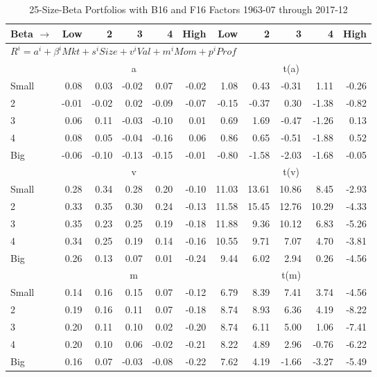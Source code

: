 
\begin{table}[H]
\footnotesize
\centering
\caption{25-Size-Beta Portfolios with B16 and F16 Factors
1963-07 through 2017-12}
\begin{tabular}{lrrrrrrrrrr}
  \toprule
    
    Beta $\rightarrow$ & Low & 2 & 3 & 4 & High & Low & 2 & 3 & 4 & High  \\ 
  \midrule
  \multicolumn{11}{l}{$R^i=a^i+\beta^iMkt+s^iSize+v^iVal+m^iMom+p^iProf$}  \\
  
     & \multicolumn{5}{c}{a} & \multicolumn{5}{c}{t(a)}   \\
     \cmidrule(r){2-6} \cmidrule(r){7-11} 
    Small  & 0.08  & 0.03  & -0.02  & 0.07  & -0.02  & 1.08  & 0.43  & -0.31  & 1.11  & -0.26   \\
    2  & -0.01  & -0.02  & 0.02  & -0.09  & -0.07  & -0.15  & -0.37  & 0.30  & -1.38  & -0.82   \\
    3  & 0.06  & 0.11  & -0.03  & -0.10  & 0.01  & 0.69  & 1.69  & -0.47  & -1.26  & 0.13   \\
    4  & 0.08  & 0.05  & -0.04  & -0.16  & 0.06  & 0.86  & 0.65  & -0.51  & -1.88  & 0.52   \\
    Big  & -0.06  & -0.10  & -0.13  & -0.15  & -0.01  & -0.80  & -1.58  & -2.03  & -1.68  & -0.05   \\

     & \multicolumn{5}{c}{v} & \multicolumn{5}{c}{t(v)}   \\
     \cmidrule(r){2-6} \cmidrule(r){7-11} 
    Small  & 0.28  & 0.34  & 0.28  & 0.20  & -0.10  & 11.03  & 13.61  & 10.86  & 8.45  & -2.93   \\
    2  & 0.33  & 0.35  & 0.30  & 0.24  & -0.13  & 11.58  & 15.45  & 12.76  & 10.29  & -4.33   \\
    3  & 0.35  & 0.23  & 0.25  & 0.19  & -0.18  & 11.88  & 9.36  & 10.12  & 6.83  & -5.26   \\
    4  & 0.34  & 0.25  & 0.19  & 0.14  & -0.16  & 10.55  & 9.71  & 7.07  & 4.70  & -3.81   \\
    Big  & 0.26  & 0.13  & 0.07  & 0.01  & -0.24  & 9.44  & 6.02  & 2.94  & 0.26  & -4.56   \\
    
  
     & \multicolumn{5}{c}{m} & \multicolumn{5}{c}{t(m)}   \\
     \cmidrule(r){2-6} \cmidrule(r){7-11} 
    Small  & 0.14  & 0.16  & 0.15  & 0.07  & -0.12  & 6.79  & 8.39  & 7.41  & 3.74  & -4.56   \\
    2  & 0.19  & 0.16  & 0.11  & 0.07  & -0.18  & 8.74  & 8.93  & 6.36  & 4.19  & -8.22   \\
    3  & 0.20  & 0.11  & 0.10  & 0.02  & -0.20  & 8.74  & 6.11  & 5.00  & 1.06  & -7.41   \\
    4  & 0.20  & 0.10  & 0.06  & -0.02  & -0.21  & 8.22  & 4.89  & 2.96  & -0.76  & -6.22   \\
    Big  & 0.16  & 0.07  & -0.03  & -0.08  & -0.22  & 7.62  & 4.19  & -1.66  & -3.27  & -5.49   \\
    

\end{tabular}
\end{table}
